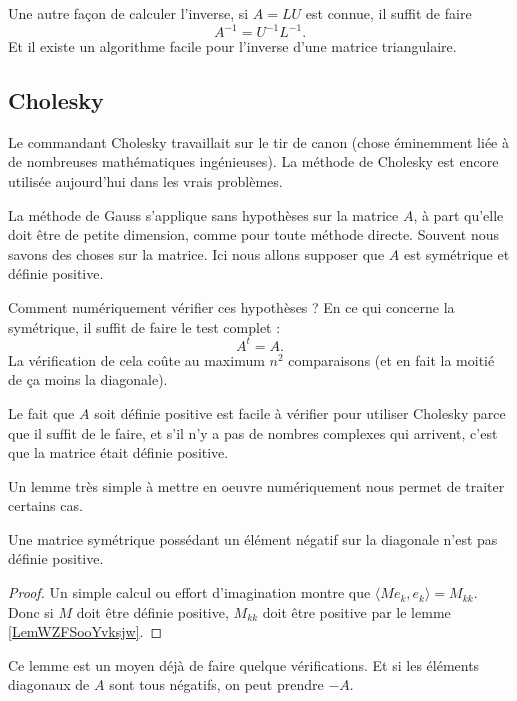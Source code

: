 Une autre façon de calculer l'inverse, si \( A=LU\) est connue, il suffit de faire 
\begin{equation}
    A^{-1}=U^{-1}L^{-1}.
\end{equation}
Et il existe un algorithme facile pour l'inverse d'une matrice triangulaire.

\subsection{Cholesky}

Le commandant Cholesky travaillait sur le tir de canon (chose éminemment liée à de nombreuses mathématiques ingénieuses). La méthode de Cholesky est encore utilisée aujourd'hui dans les vrais problèmes.

La méthode de Gauss s'applique sans hypothèses sur la matrice \( A\), à part qu'elle doit être de petite dimension, comme pour toute méthode directe. Souvent nous savons des choses sur la matrice. Ici nous allons supposer que \( A\) est symétrique et définie positive.

Comment numériquement vérifier ces hypothèses ? En ce qui concerne la symétrique, il suffit de faire le test complet :
\begin{equation}
    A^t=A.
\end{equation}
La vérification de cela coûte au maximum \( n^2\) comparaisons (et en fait la moitié de ça moins la diagonale). 

Le fait que \( A\) soit définie positive est facile à vérifier pour utiliser Cholesky parce que il suffit de le faire, et s'il n'y a pas de nombres complexes qui arrivent, c'est que la matrice était définie positive.

Un lemme très simple à mettre en oeuvre numériquement nous permet de traiter certains cas.
\begin{lemma}
    Une matrice symétrique possédant un élément négatif sur la diagonale n'est pas définie positive.
\end{lemma}

\begin{proof}
    Un simple calcul ou effort d'imagination montre que \( \langle Me_k, e_k\rangle =M_{kk}\). Donc si \( M\) doit être définie positive, \( M_{kk}\) doit être positive par le lemme \ref{LemWZFSooYvksjw}.
\end{proof}
Ce lemme est un moyen déjà de faire quelque vérifications. Et si les éléments diagonaux de \( A\) sont tous négatifs, on peut prendre \( -A\).

